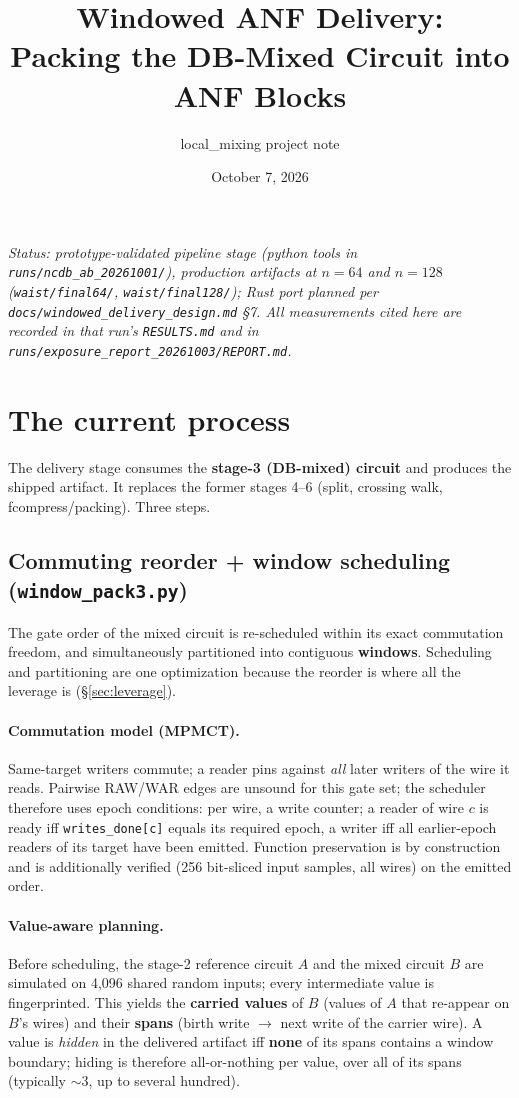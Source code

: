 \documentclass[11pt]{article}
\title{Windowed ANF Delivery:\\ Packing the DB-Mixed Circuit into ANF Blocks}
\author{local\_mixing project note}
\date{October 7, 2026}
\newcommand{\code}[1]{\texttt{#1}}
\begin{document}
\maketitle

\noindent\emph{Status: prototype-validated pipeline stage (python tools in
\code{runs/ncdb\_ab\_20261001/}), production artifacts at $n=64$ and $n=128$
(\code{waist/final64/}, \code{waist/final128/}); Rust port planned per
\code{docs/windowed\_delivery\_design.md} \S7. All measurements cited here are
recorded in that run's \code{RESULTS.md} and in
\code{runs/exposure\_report\_20261003/REPORT.md}.}

\section{The current process}

The delivery stage consumes the \textbf{stage-3 (DB-mixed) circuit} and
produces the shipped artifact. It replaces the former stages 4--6 (split,
crossing walk, fcompress/packing). Three steps.

\subsection{Commuting reorder + window scheduling (\code{window\_pack3.py})}

The gate order of the mixed circuit is re-scheduled within its exact
commutation freedom, and simultaneously partitioned into contiguous
\textbf{windows}. Scheduling and partitioning are one optimization because
the reorder is where all the leverage is (\S\ref{sec:leverage}).

\paragraph{Commutation model (MPMCT).} Same-target writers commute; a reader
pins against \emph{all} later writers of the wire it reads. Pairwise RAW/WAR
edges are unsound for this gate set; the scheduler therefore uses epoch
conditions: per wire, a write counter; a reader of wire $c$ is ready iff
\code{writes\_done[c]} equals its required epoch, a writer iff all
earlier-epoch readers of its target have been emitted. Function preservation
is by construction and is additionally verified (256 bit-sliced input
samples, all wires) on the emitted order.

\paragraph{Value-aware planning.} Before scheduling, the stage-2 reference
circuit $A$ and the mixed circuit $B$ are simulated on 4{,}096 shared random
inputs; every intermediate value is fingerprinted. This yields the
\textbf{carried values} of $B$ (values of $A$ that re-appear on $B$'s wires)
and their \textbf{spans} (birth write $\to$ next write of the carrier wire).
A value is \emph{hidden} in the delivered artifact iff \textbf{none} of its
spans contains a window boundary; hiding is therefore all-or-nothing per
value, over all of its spans (typically ${\sim}3$, up to several hundred).
\end{document}
